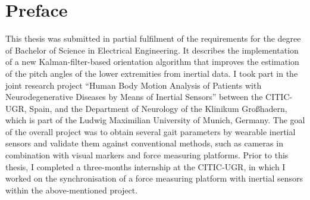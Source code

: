 \chapter{Preface}

This thesis was submitted in partial fulfilment of the requirements for the degree of Bachelor of Science in Electrical Engineering. It describes the implementation of a new Kalman-filter-based orientation algorithm that improves the estimation of the pitch angles of the lower extremities from inertial data. I took part in the joint research project “Human Body Motion Analysis of Patients with Neurodegenerative Diseases by Means of Inertial Sensors” between the \gls{CITIC-UGR}, Spain, and the Department of Neurology of the Klinikum Großhadern, which is part of the Ludwig Maximilian University of Munich, Germany. The goal of the overall project was to obtain several gait parameters by wearable inertial sensors and validate them against conventional methods, such as cameras in combination with visual markers and force measuring platforms. Prior to this thesis, I completed a three-months internship at the \gls{CITIC-UGR}, in which I worked on the synchronisation of a force measuring platform with inertial sensors within the above-mentioned project.